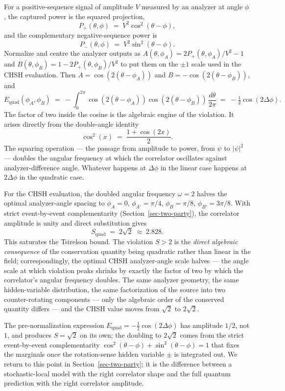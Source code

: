\documentclass[
  11pt]{article}
\begin{document}
For a positive-sequence signal of amplitude \(V\) measured by an
analyzer at angle \(\phi\), the captured power is the squared
projection, \[
P_+(\theta, \phi) \;=\; V^2 \cos^2(\theta - \phi),
\] and the complementary negative-sequence power is \[
P_-(\theta, \phi) \;=\; V^2 \sin^2(\theta - \phi).
\] Normalize and centre the analyzer outputs as
\(A(\theta, \phi_A) = 2 P_+(\theta, \phi_A)/V^2 - 1\) and
\(B(\theta, \phi_B) = 1 - 2 P_+(\theta, \phi_B)/V^2\) to put them on the
\(\pm 1\) scale used in the CHSH evaluation. Then
\(A = \cos(2(\theta - \phi_A))\) and \(B = -\cos(2(\theta - \phi_B))\),
and \[
E_\text{quad}(\phi_A, \phi_B) \;=\; -\int_0^{2\pi} \cos(2(\theta - \phi_A)) \cos(2(\theta - \phi_B))\, \frac{d\theta}{2\pi} \;=\; -\tfrac{1}{2}\cos(2\Delta\phi).
\] The factor of two inside the cosine is the algebraic engine of the
violation. It arises directly from the double-angle identity \[
\cos^2(x) \;=\; \frac{1 + \cos(2x)}{2}.
\] The squaring operation --- the passage from amplitude to power, from
\(\psi\) to \(|\psi|^2\) --- doubles the angular frequency at which the
correlator oscillates against analyzer-difference angle. Whatever
happens at \(\Delta\phi\) in the linear case happens at \(2\Delta\phi\)
in the quadratic case.

For the CHSH evaluation, the doubled angular frequency \(\omega = 2\)
halves the optimal analyzer-angle spacing to \(\phi_A = 0\),
\(\phi_{A'} = \pi/4\), \(\phi_B = \pi/8\), \(\phi_{B'} = 3\pi/8\). With
strict event-by-event complementarity (Section~\ref{sec-two-party}), the
correlator amplitude is unity and direct substitution gives \[
S_\text{quad} \;=\; 2\sqrt{2} \;\approx\; 2.828.
\] This saturates the Tsirelson bound. The violation \(S > 2\) is the
\emph{direct algebraic consequence} of the conservation quantity being
quadratic rather than linear in the field; correspondingly, the optimal
CHSH analyzer-angle scale halves --- the angle scale at which violation
peaks shrinks by exactly the factor of two by which the correlator's
angular frequency doubles. The same analyzer geometry, the same
hidden-variable distribution, the same factorization of the source into
two counter-rotating components --- only the algebraic order of the
conserved quantity differs --- and the CHSH value moves from
\(\sqrt{2}\) to \(2\sqrt{2}\).

The pre-normalization expression
\(E_\text{quad} = -\tfrac{1}{2}\cos(2\Delta\phi)\) has amplitude
\(1/2\), not \(1\), and produces \(S = \sqrt{2}\) on its own; the
doubling to \(2\sqrt{2}\) comes from the strict event-by-event
complementarity \(\cos^2(\theta - \phi) + \sin^2(\theta - \phi) = 1\)
that fixes the marginals once the rotation-sense hidden variable \(\pm\)
is integrated out. We return to this point in
Section~\ref{sec-two-party}; it is the difference between a
stochastic-local model with the right correlator shape and the full
quantum prediction with the right correlator amplitude.
\end{document}
